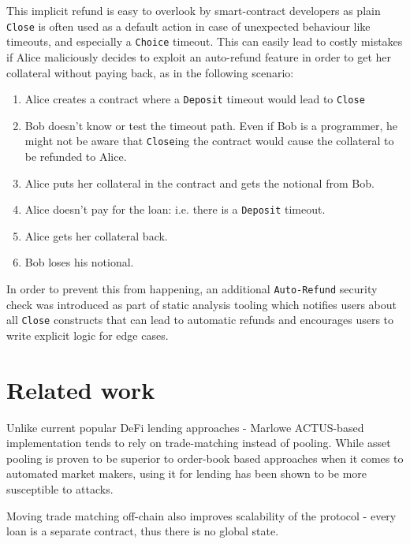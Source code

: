 \documentclass[runningheads]{llncs}
\begin{document}
This implicit refund is easy to overlook by smart-contract developers
as plain \texttt{Close} is often used as a default action in case of unexpected
behaviour like timeouts, and especially a \texttt{Choice} timeout. This can easily
lead to costly %
mistakes if  Alice maliciously decides to
exploit an auto-refund feature in order to get her collateral without
paying back, as in the following scenario:
\begin{enumerate}
\item Alice creates a contract where a \texttt{Deposit} timeout would lead to \texttt{Close} 
\item Bob doesn't know or test the timeout path. Even if Bob is a programmer,
he might not be aware that \texttt{Close}ing the contract would cause the collateral
to be refunded to Alice.
\item Alice puts her collateral in the contract and gets the notional from Bob.
\item Alice doesn't pay for the loan: i.e. there is a \texttt{Deposit} timeout. 
\item Alice gets her collateral back. 
\item Bob loses his notional. 
\end{enumerate}
In order to prevent this from happening, an additional \texttt{Auto-Refund}
security check was introduced as part of static analysis tooling which
notifies users about all \texttt{Close} constructs that can lead to automatic
refunds and encourages users to write explicit logic for edge cases.

\section{Related work}\label{related}



Unlike current popular DeFi lending approaches - Marlowe ACTUS-based
implementation tends to rely on trade-matching instead of pooling.
While asset pooling is proven to be superior to order-book based approaches
when it comes to automated market makers, using it for lending has
been shown to be more susceptible to attacks\cite{flash-loan}.

Moving trade matching off-chain also improves scalability of the protocol
- every loan is a separate contract, thus there is no global state.
\end{document}
